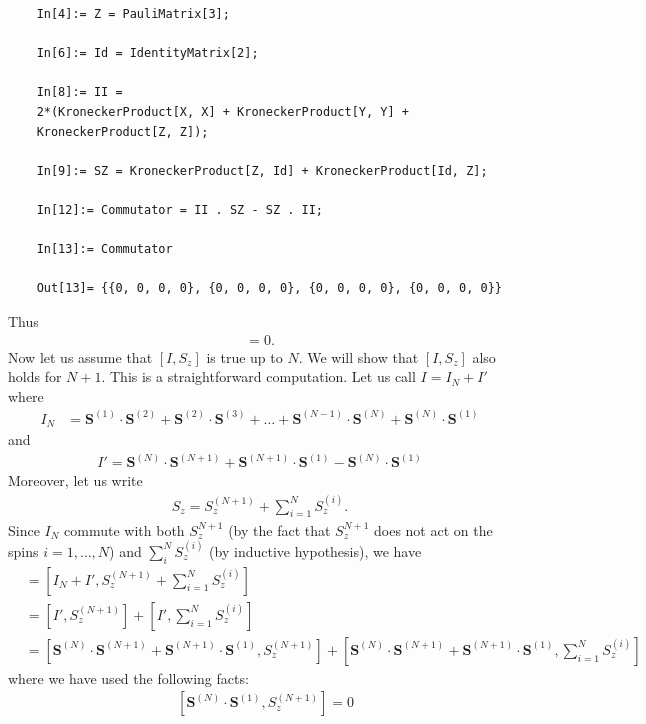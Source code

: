 \documentclass{article}
\theoremstyle{definition}
\newcommand{\lb}{\left[}
\newcommand{\rb}{\right]}
\begin{document}
\begin{enumerate}[label=(\alph*)]
\begin{lstlisting}
	In[4]:= Z = PauliMatrix[3];
	
	In[6]:= Id = IdentityMatrix[2];
	
	In[8]:= II = 
	2*(KroneckerProduct[X, X] + KroneckerProduct[Y, Y] + 
	KroneckerProduct[Z, Z]);
	
	In[9]:= SZ = KroneckerProduct[Z, Id] + KroneckerProduct[Id, Z];
	
	In[12]:= Commutator = II . SZ - SZ . II;
	
	In[13]:= Commutator
	
	Out[13]= {{0, 0, 0, 0}, {0, 0, 0, 0}, {0, 0, 0, 0}, {0, 0, 0, 0}}
	\end{lstlisting}
	Thus 
	\begin{align*}
	[I^{(2)}, Sz]  = 0.
	\end{align*}
	Now let us assume that $[I, S_z]$ is true up to $N$. We will show that $[I,S_z]$ also holds for $N+1$. This is a straightforward computation. Let us call $I = I_N + I'$ where 
	\begin{align*}
	I_N 
	&= \mathbf{S}^{(1)}\cdot \mathbf{S}^{(2)}+ \mathbf{S}^{(2)}\cdot \mathbf{S}^{(3)} + \dots + \mathbf{S}^{(N-1)}\cdot \mathbf{S}^{(N)}+ \mathbf{S}^{(N)}\cdot \mathbf{S}^{(1)} 
	\end{align*}
	and 
	\begin{align*}
	I' = \mathbf{S}^{(N)}\cdot \mathbf{S}^{(N+1)} + \mathbf{S}^{(N+1)}\cdot \mathbf{S}^{(1)}  -\mathbf{S}^{(N)}\cdot \mathbf{S}^{(1)} 
	\end{align*}
	Moreover, let us write 
	\begin{align*}
	S_z = S_z^{(N+1)} +\sum_{i=1}^N S_z^{(i)}.
	\end{align*}
	Since $I_N$ commute with both $S_z^{N+1}$ (by the fact that $S_z^{N+1}$ does not act on the spins $i=1,\dots,N$) and $\sum_i^N S_z^{(i)}$ (by inductive hypothesis), we have
	\begin{align*}
	[I,S_z]
	&= \lb I_N + I' , S_z^{(N+1)} +\sum_{i=1}^N S_z^{(i)} \rb \\
	&= \lb I' , S_z^{(N+1)}\rb  +\lb I', \sum_{i=1}^N S_z^{(i)} \rb \\
	&= \lb \mathbf{S}^{(N)}\cdot \mathbf{S}^{(N+1)} + \mathbf{S}^{(N+1)}\cdot \mathbf{S}^{(1)} , S_z^{(N+1)} \rb + \lb \mathbf{S}^{(N)}\cdot \mathbf{S}^{(N+1)} + \mathbf{S}^{(N+1)}\cdot \mathbf{S}^{(1)}  , \sum_{i=1}^N S_z^{(i)}\rb 
	\end{align*}
	where we have used the following facts: 
	\begin{align*}
	&\lb  \mathbf{S}^{(N)}\cdot \mathbf{S}^{(1)} , S_z^{(N+1)} \rb = 0\\

\end{align*}
\end{enumerate}
\end{document}
